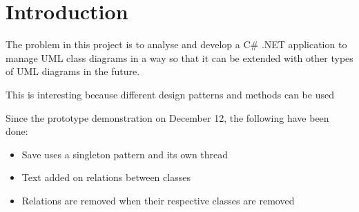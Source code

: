 \chapter{Introduction}
\label{sec:introduction}



The problem in this project is to analyse and develop a C\# .NET  application to manage UML class diagrams in a way so that it can be extended with other types of UML diagrams in the future.

This is interesting because different design patterns and methods can be used








Since the prototype demonstration on December 12, the following have been done:

\begin{itemize}
  \item Save uses a singleton pattern and its own thread
  \item Text added on relations between classes
  \item Relations are removed when their respective classes are removed
\end{itemize}